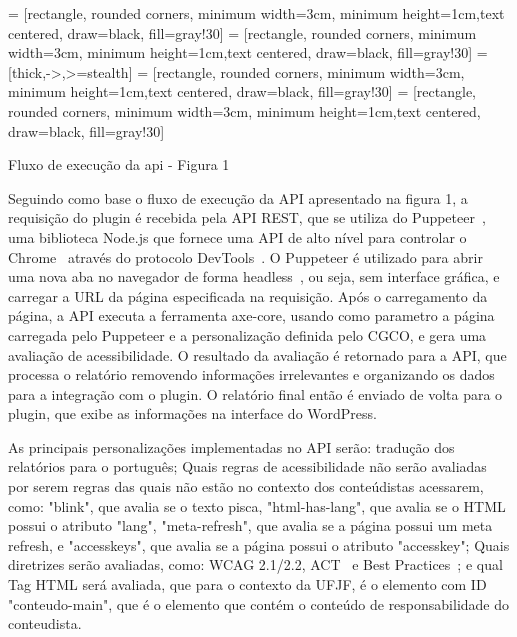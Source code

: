 \documentclass[12pt]{article}
\begin{document}
 = [rectangle, rounded corners, minimum width=3cm,
    minimum height=1cm,text centered, draw=black, fill=gray!30]
 = [rectangle, rounded corners, minimum width=3cm,
    minimum height=1cm,text centered, draw=black, fill=gray!30]
 = [thick,->,>=stealth]
 = [rectangle, rounded corners, minimum width=3cm,
    minimum height=1cm,text centered, draw=black, fill=gray!30]
 = [rectangle, rounded corners, minimum width=3cm,
    minimum height=1cm,text centered, draw=black, fill=gray!30]

Fluxo de execução da api - Figura 1
\bigbreak

Seguindo como base o fluxo de execução da API apresentado na figura 1,
a requisição do plugin é recebida pela API REST, que se utiliza
do Puppeteer~\autocite{puppeteer}, uma biblioteca Node.js que fornece uma
API de alto nível para controlar o Chrome~\autocite{chrome} através do protocolo
DevTools~\autocite{devtools}. O Puppeteer é utilizado para abrir uma nova aba no navegador de forma
headless~\autocite{headless}, ou seja, sem interface gráfica, e carregar a URL da página
especificada na requisição. Após o carregamento da página, a API
executa a ferramenta axe-core, usando como parametro a página carregada
pelo Puppeteer e a personalização definida pelo CGCO, e gera uma avaliação
de acessibilidade. O resultado da avaliação é retornado para a API, que
processa o relatório removendo informações irrelevantes e organizando os dados
para a integração com o plugin. O relatório final então é enviado de
volta para o plugin, que exibe as informações na interface do WordPress.

As principais personalizações implementadas no API serão: 
tradução dos relatórios para o português; Quais regras de acessibilidade 
não serão avaliadas por serem regras das quais não estão no contexto dos conteúdistas acessarem, como: "blink", que avalia se o texto pisca, 
"html-has-lang", que avalia se o HTML possui o atributo
"lang", "meta-refresh", que avalia se a página possui um meta refresh, e
"accesskeys", que avalia se a página possui o atributo "accesskey"; Quais 
diretrizes serão avaliadas, como: WCAG 2.1/2.2, ACT~\autocite{ACT} e Best Practices~\autocite{BP}; e qual
Tag HTML será avaliada, que para o contexto da UFJF, é o elemento com ID "conteudo-main",
que é o elemento que contém o conteúdo de responsabilidade do conteudista.
\end{document}
